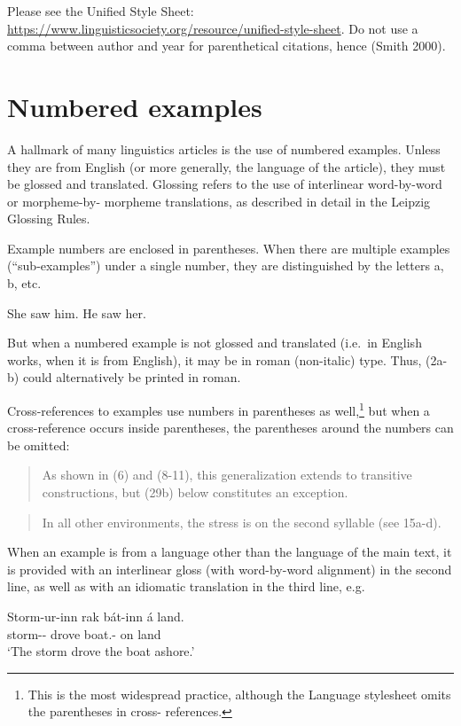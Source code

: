 \documentclass[a4paper]{article}
\newenvironment{gsrexq}{\begin{quote}\color{blue}}{\end{quote}}
\newcommand{\gsrex}[1]{{\color{blue}#1}}
\newcommand{\eagsr}{\bgroup\color{blue}\ea}
\newcommand{\zgsr}{\z\egroup}
\begin{document}
Please see the Unified Style Sheet:\\ \url{https://www.linguisticsociety.org/resource/unified-style-sheet}. Do not use a comma between author and year for parenthetical citations, hence \gsrex{(Smith 2000)}.

\section{Numbered examples}\label{sec:numberedexamples}

A hallmark of many linguistics articles is the use of numbered examples.
Unless they are from English (or more generally, the language of the
article), they must be glossed and translated. Glossing refers to the
use of interlinear word-by-word or morpheme-by- morpheme translations,
as described in detail in the Leipzig Glossing Rules. 

Example numbers
are enclosed in parentheses. When there are multiple examples
(``sub-examples'') under a single number, they are distinguished by the
letters a, b, etc.

\eagsr
  \eagsr She saw him. 
  \ex He saw her.
  \zgsr
\zgsr

But when a numbered example is not glossed and translated (i.e.~in
English works, when it is from English), it may be in roman (non-italic)
type. Thus, (2a-b) could alternatively be printed in roman.

Cross-references to examples use numbers in parentheses as well,\footnote{This is the most widespread practice, although the Language stylesheet omits the parentheses in cross- references.} but when a cross-reference occurs inside parentheses, the parentheses around the numbers can be omitted:

\begin{gsrexq}
  As shown in (6) and (8-11), this generalization extends to transitive constructions, but (29b) below constitutes an exception.
\end{gsrexq}

\begin{gsrexq}
  In all other environments, the stress is on the second syllable (see 15a-d).
\end{gsrexq}

When an example is from a language other than the language of the main text, it
is provided with an interlinear gloss (with word-by-word alignment) in
the second line, as well as with an idiomatic translation in the third
line, e.g.

\eagsr
\gll Storm-ur-inn  rak   bát-inn      á land.\\
     storm-\NOM-\DEF{} drove boat.\ACC-\DEF{} on land\\
\glt     `The storm drove the boat ashore.'
\zgsr
\end{document}
